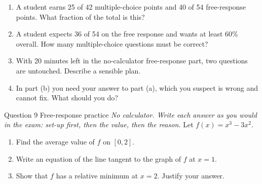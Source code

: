 \documentclass[11pt]{article}
\begin{document}
\begin{enumerate}[leftmargin=*,itemsep=2pt,start=5]
  \item A student earns 25 of 42 multiple-choice points and 40 of 54 free-response points. What fraction of the total is this?\work{2.8cm}
  \item A student expects 36 of 54 on the free response and wants at least 60\% overall. How many multiple-choice questions must be correct?\work{2.8cm}
  \item With 20 minutes left in the no-calculator free-response part, two questions are untouched. Describe a sensible plan.\work{2.8cm}
  \item In part (b) you need your answer to part (a), which you suspect is wrong and cannot fix. What should you do?\work{2.8cm}
\end{enumerate}

\begin{frbox}{Question 9 \textperiodcentered{} Free-response practice}
\emph{No calculator. Write each answer as you would in the exam: set-up first, then the value, then the reason.} Let $f(x)=x^3-3x^2$.
\begin{enumerate}[label=(\alph*),leftmargin=*,itemsep=2pt]
  \item Find the average value of $f$ on $[0,2]$.\work{2.6cm}
  \item Write an equation of the line tangent to the graph of $f$ at $x=1$.\work{2.6cm}
  \item Show that $f$ has a relative minimum at $x=2$. Justify your answer.\work{2.6cm}
\end{enumerate}
\end{frbox}
\end{document}
